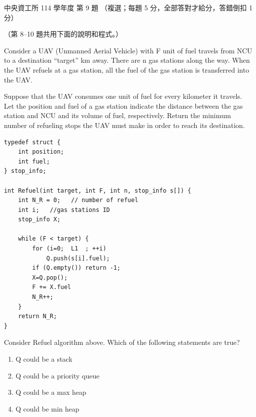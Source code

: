 \begin{pastexam}[label={px:ncu-114-dsa-09}]{中央資工所 114 學年度 第 9 題}
（複選；每題 5 分，全部答對才給分，答錯倒扣 1 分）

（第 8--10 題共用下面的說明和程式。）

Consider a UAV (Unmanned Aerial Vehicle) with F unit of fuel travels from NCU to a destination
``target'' km away. There are n gas stations along the way. When the UAV refuels at a gas station, all
the fuel of the gas station is transferred into the UAV.

Suppose that the UAV consumes one unit of fuel for every kilometer it travels. Let the position and fuel
of a gas station indicate the distance between the gas station and NCU and its volume of fuel,
respectively. Return the minimum number of refueling stops the UAV must make in order to reach its
destination.
\begin{verbatim}
typedef struct {
    int position;
    int fuel;
} stop_info;

int Refuel(int target, int F, int n, stop_info s[]) {
    int N_R = 0;   // number of refuel
    int i;   //gas stations ID
    stop_info X;

    while (F < target) {
        for (i=0;  L1  ; ++i)
            Q.push(s[i].fuel);
        if (Q.empty()) return -1;
        X=Q.pop();
        F += X.fuel
        N_R++;
    }
    return N_R;
}
\end{verbatim}

Consider Refuel algorithm above. Which of the following statements are true?
\begin{enumerate}[label=(\alph*)]
\item Q could be a stack
\item Q could be a priority queue
\item Q could be a max heap
\item Q could be min heap
\end{enumerate}
\end{pastexam}

